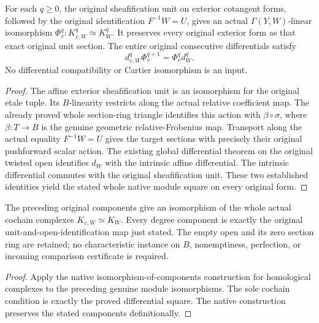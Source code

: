 \begin{lemma}
\label{lem:cartier-geometric-chart-form-exchange}
\leanok
{}
For each $q\ge0$, the original sheafification unit on exterior
cotangent forms, followed by the original identification
$F^{-1}W=U$, gives an actual $\Gamma(Y,W)$-linear isomorphism
$\Phi_v^q:K_{v,W}^q\simeq K_W^q$. It preserves every original exterior
form as that exact original unit section. The entire original
consecutive differentials satisfy
\[
 d_{v,W}^q\Phi_v^{q+1}=\Phi_v^q d_W^q.
\]
No differential compatibility or Cartier isomorphism is an input.
\end{lemma}
\begin{proof}
The affine exterior sheafification unit is an isomorphism for the
original etale tuple. Its $B$-linearity restricts along the actual
relative coefficient map. The already proved whole section-ring
triangle identifies this action with $\beta\circ\sigma$, where
$\beta:T\to B$ is the genuine geometric relative-Frobenius map.
Transport along the actual equality $F^{-1}W=U$ gives the target
sections with precisely their original pushforward scalar action.
The existing global differential theorem on the original twisted
open identifies $d_W$ with the intrinsic affine differential.
The intrinsic differential commutes with the original sheafification
unit. These two established identities yield the stated whole native
module square on every original form.
\end{proof}

\begin{theorem}
\label{thm:cartier-geometric-chart-complex-exchange}
\leanok
{}
The preceding original components give an isomorphism of the whole
actual cochain complexes $K_{v,W}\simeq K_W$. Every degree component
is exactly the original unit-and-open-identification map just stated.
The empty open and its zero section ring are retained; no characteristic
instance on $B$, nonemptiness, perfection, or incoming comparison
certificate is required.
\end{theorem}
\begin{proof}
Apply the native isomorphism-of-components construction for homological
complexes to the preceding genuine module isomorphisms. The sole
cochain condition is exactly the proved differential square.
The native construction preserves the stated components definitionally.
\end{proof}

